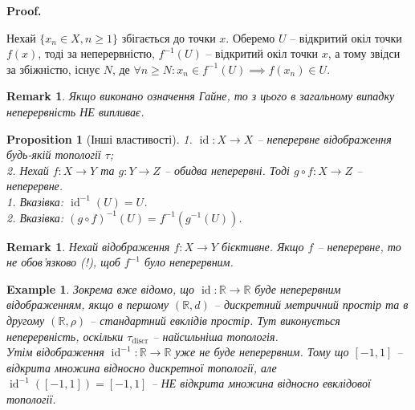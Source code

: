 \documentclass[a4paper, 10pt]{article}
\makeatletter
\theoremstyle{theoremdd}
\newtheorem{example}[theorem]{Example}
\newtheorem{proposition}[theorem]{Proposition}
\newtheorem{remark}[theorem]{Remark}
\DeclareMathOperator{\id}{id}
\renewenvironment{proof}[1][Proof.\\]{\par
\pushQED{\hfill \qed}%
\normalfont \topsep6\p@\@plus6\p@\relax
\trivlist
\item\relax
{\bfseries
#1\@addpunct{.}}\hspace\labelsep\ignorespaces
}{%
\popQED\endtrivlist\@endpefalse
}
\makeatother
\begin{document}
\begin{proof}
Нехай $\{x_n \in X, n \geq 1\}$ збігається до точки $x$. Оберемо $U$ -- відкритий окіл точки $f(x)$, тоді за неперервністю, $f^{-1}(U)$ -- відкритий окіл точки $x$, а тому звідси за збіжністю, існує $N$, де $\forall n \geq N: x_n \in f^{-1}(U) \implies f(x_n) \in U$.
\end{proof}

\begin{remark}
Якщо виконано означення Гайне, то з цього в загальному випадку неперервність НЕ випливає.
\end{remark}

\begin{proposition}[Інші властивості]
1. $\id \colon X \to X$ -- неперервне відображення будь-якій топології $\tau$;\\
2. Нехай $f \colon X \to Y$ та $g \colon Y \to Z$ -- обидва неперервні. Тоді $g \circ f \colon X \to Z$ -- неперервне.
\bigskip \\
1. \textit{Вказівка: $\id^{-1}(U) = U$.}\\
2. \textit{Вказівка: $(g \circ f)^{-1}(U) = f^{-1}(g^{-1}(U))$.}
\end{proposition}

\begin{remark}
Нехай відображення $f \colon X \to Y$ бієктивне. Якщо $f$ -- неперервне, то не обов'язково (!), щоб $f^{-1}$ було неперервним.
\end{remark}

\begin{example}
Зокрема вже відомо, що $\id \colon \mathbb{R} \to \mathbb{R}$ буде неперервним відображенням, якщо в першому $(\mathbb{R},d)$ -- дискретний метричний простір та в другому $(\mathbb{R},\rho)$ -- стандартний евклідів простір. Тут виконується неперервність, оскільки $\tau_{\text{discr}}$ -- найсильніша топологія.\\
Утім відображення $\id^{-1} \colon \mathbb{R} \to \mathbb{R}$ уже не буде неперервним. Тому що $[-1,1]$ -- відкрита множина відносно дискретної топології, але $\id^{-1}([-1,1]) = [-1,1]$ -- НЕ відкрита множина відносно евклідової топології.
\end{example}
\end{document}
